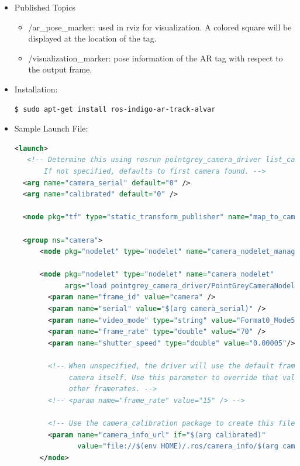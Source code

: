 \begin{itemize}
\begin{itemize}
\item <camera\_topic\_node>/image\_raw: image frames from camera
\item <camera\_topic\_node>/camera\_info: camera metadata from respective calibration file
\end{itemize}
\item Published Topics
\begin{itemize}
\item /ar\_pose\_marker: used in rviz for visualization. A colored square will be displayed at the location of the tag.
\item /visualization\_marker: pose information of the AR tag with respect to the output frame.
\end{itemize}
\item Installation:
\begin{lstlisting}[language=bash]
$ sudo apt-get install ros-indigo-ar-track-alvar
\end{lstlisting}
\item Sample Launch File:
\begin{lstlisting}[language=xml]
<launch>
   <!-- Determine this using rosrun pointgrey_camera_driver list_cameras.
       If not specified, defaults to first camera found. -->
  <arg name="camera_serial" default="0" />
  <arg name="calibrated" default="0" />

  <node pkg="tf" type="static_transform_publisher" name="map_to_camera" output="screen" args="0 0 0 0 0 0 world camera 10" />

  <group ns="camera">
      <node pkg="nodelet" type="nodelet" name="camera_nodelet_manager" args="manager" />

      <node pkg="nodelet" type="nodelet" name="camera_nodelet"
            args="load pointgrey_camera_driver/PointGreyCameraNodelet camera_nodelet_manager" >
        <param name="frame_id" value="camera" />
        <param name="serial" value="$(arg camera_serial)" />
        <param name="video_mode" type="string" value="Format0_Mode5"/>
        <param name="frame_rate" type="double" value="70" />
        <param name="shutter_speed" type="double" value="0.00005"/>

        <!-- When unspecified, the driver will use the default framerate as given by the
             camera itself. Use this parameter to override that value for cameras capable of
             other framerates. -->
        <!-- <param name="frame_rate" value="15" /> -->
        
        <!-- Use the camera_calibration package to create this file -->
        <param name="camera_info_url" if="$(arg calibrated)"
               value="file://$(env HOME)/.ros/camera_info/$(arg camera_serial).yaml" />
      </node>


\end{lstlisting}
\end{itemize}
